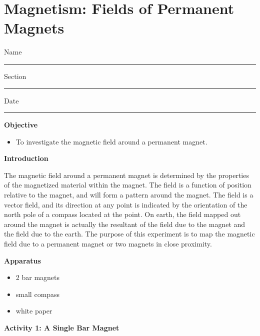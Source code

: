 
\section{Magnetism: Fields of Permanent Magnets }

Name \rule{2.0in}{0.1pt}\hfill{}Section \rule{1.0in}{0.1pt}\hfill{}Date
\rule{1.0in}{0.1pt}

\textbf{Objective}

\begin{itemize}
\item To investigate the magnetic field around a permanent magnet.
\end{itemize}
\textbf{Introduction} 

The magnetic field around a permanent magnet is determined by the properties 
of the magnetized material within the magnet. The field is a function of 
position relative to the magnet, and will form a pattern around the magnet. 
The field is a vector field, and its direction at any point is indicated by 
the orientation of the north pole of a compass located at the point. On earth, 
the field mapped out around the magnet is actually the resultant of the field 
due to the magnet and the field due to the earth. The purpose of this 
experiment is to map the magnetic field due to a permanent magnet or two 
magnets in close proximity.

\textbf{Apparatus}

\begin{itemize}
\item 2 bar magnets 
\item small compass 
\item white paper
\end{itemize}
\textbf{Activity 1: A Single Bar Magnet}

\vspace{0.3cm}
{\centering {} \par}
\vspace{0.3cm}

